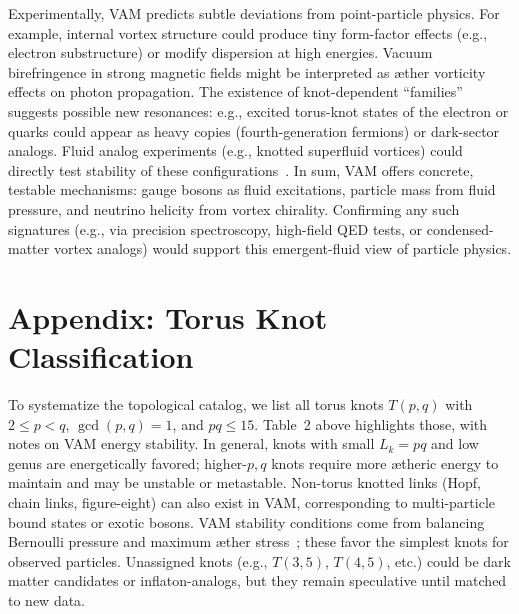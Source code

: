 \documentclass[a4paper,12pt]{article}
\begin{document}
Experimentally, VAM predicts subtle deviations from point-particle physics. For example, internal vortex structure could produce tiny form-factor effects (e.g., electron substructure) or modify dispersion at high energies. Vacuum birefringence in strong magnetic fields might be interpreted as æther vorticity effects on photon propagation. The existence of knot-dependent “families” suggests possible new resonances: e.g., excited torus-knot states of the electron or quarks could appear as heavy copies (fourth-generation fermions) or dark-sector analogs. Fluid analog experiments (e.g., knotted superfluid vortices) could directly test stability of these configurations~\cite{4-StandardModel-Lagrangian-VAM,Optical-Knots-Contact-Geometry-II}. In sum, VAM offers concrete, testable mechanisms: gauge bosons as fluid excitations, particle mass from fluid pressure, and neutrino helicity from vortex chirality. Confirming any such signatures (e.g., via precision spectroscopy, high-field QED tests, or condensed-matter vortex analogs) would support this emergent-fluid view of particle physics.

\section*{Appendix: Torus Knot Classification}
To systematize the topological catalog, we list all torus knots $T(p,q)$ with $2\leq p<q$, $\gcd(p,q)=1$, and $pq\leq 15$. Table~2 above highlights those, with notes on VAM energy stability. In general, knots with small $L_k=pq$ and low genus are energetically favored; higher-$p,q$ knots require more ætheric energy to maintain and may be unstable or metastable. Non-torus knotted links (Hopf, chain links, figure-eight) can also exist in VAM, corresponding to multi-particle bound states or exotic bosons. VAM stability conditions come from balancing Bernoulli pressure and maximum æther stress~\cite{4-StandardModel-Lagrangian-VAM,Appendix_CalculateNeucleusMass}; these favor the simplest knots for observed particles. Unassigned knots (e.g., $T(3,5)$, $T(4,5)$, etc.) could be dark matter candidates or inflaton-analogs, but they remain speculative until matched to new data.
\end{document}
